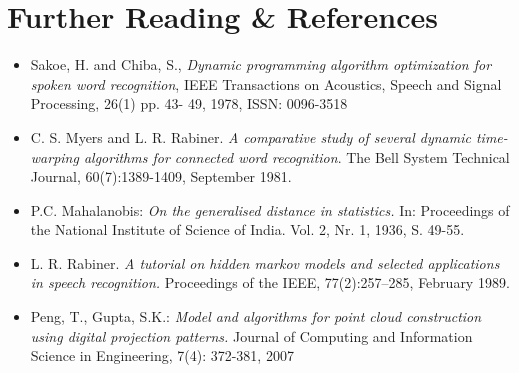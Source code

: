 \documentclass[titlepage,12pt,a4paper]{article}
\begin{document}
\section{Further Reading \& References}
\begin{itemize}
	\item Sakoe, H. and Chiba, S., \emph{Dynamic programming algorithm optimization for spoken word recognition}, IEEE Transactions on Acoustics, Speech and Signal Processing, 26(1) pp. 43- 49, 1978, ISSN: 0096-3518
	\item C. S. Myers and L. R. Rabiner. \emph{A comparative study of several dynamic time-warping algorithms for connected word recognition}. The Bell System Technical Journal, 60(7):1389-1409, September 1981.
	\item P.C. Mahalanobis: \emph{On the generalised distance in statistics.} In: Proceedings of the National Institute of Science of India. Vol. 2, Nr. 1, 1936, S. 49-55.
	\item L. R. Rabiner. \emph{A tutorial on hidden markov models and selected applications in speech recognition.} Proceedings of the IEEE, 77(2):257–285, February 1989.
	\item Peng, T., Gupta, S.K.: \emph{Model and algorithms for point cloud construction using digital projection patterns.} Journal of Computing and Information Science in Engineering, 7(4): 372-381, 2007
\end{itemize}
\end{document}
